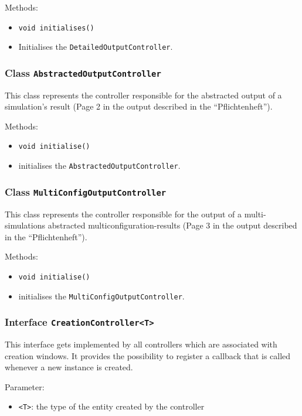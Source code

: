 \documentclass[parskip=full,11pt]{scrartcl}
\begin{document}
Methods:
\begin{itemize}\itemsep -10pt
\item \texttt{void initialises()}
\item[] Initialises the \texttt{DetailedOutputController}.
\end{itemize}

\subsubsection{Class \texttt{AbstractedOutputController}}
This class represents the controller responsible for the abstracted output of a simulation's result (Page 2 in the output described in the \enquote{Pflichtenheft}).

Methods:
\begin{itemize}\itemsep -10pt
\item \texttt{void initialise()}
\item[] initialises the \texttt{AbstractedOutputController}.
\end{itemize}

\subsubsection{Class \texttt{MultiConfigOutputController}}
This class represents the controller responsible for the output of a multi-simulations abstracted multiconfiguration-results (Page 3 in the output described in the \enquote{Pflichtenheft}).

Methods:
\begin{itemize}\itemsep -10pt
\item \texttt{void initialise()}
\item[] initialises the \texttt{MultiConfigOutputController}.
\end{itemize}

\subsubsection{Interface \texttt{CreationController<T>}}

This interface gets implemented by all controllers which are associated with creation windows. It provides the possibility to register a callback that is called whenever a new instance is created.

Parameter:
\begin{itemize} \itemsep -10pt
	\item \texttt{<T>}: the type of the entity created by the controller
\end{itemize}
\end{document}
